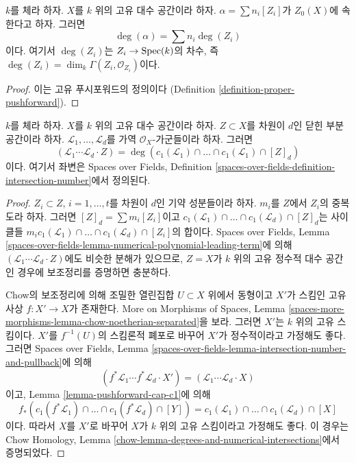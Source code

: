 \begin{lemma}
\label{lemma-spell-out-degree-zero-cycle}
$k$를 체라 하자. $X$를 $k$ 위의 고유 대수 공간이라 하자.
$\alpha = \sum n_i[Z_i]$가 $Z_0(X)$에 속한다고 하자. 그러면
$$
\deg(\alpha) = \sum n_i\deg(Z_i)
$$
이다. 여기서 $\deg(Z_i)$는 $Z_i \to \mathop{\mathrm{Spec}}(k)$의 차수, 즉
$\deg(Z_i) = \dim_k \Gamma(Z_i, \mathcal{O}_{Z_i})$이다.
\end{lemma}

\begin{proof}
이는 고유 푸시포워드의 정의이다
(Definition \ref{definition-proper-pushforward}).
\end{proof}

\begin{lemma}
\label{lemma-degrees-and-numerical-intersections}
$k$를 체라 하자. $X$를 $k$ 위의 고유 대수 공간이라 하자.
$Z \subset X$를 차원이 $d$인 닫힌 부분공간이라 하자.
$\mathcal{L}_1, \ldots, \mathcal{L}_d$를 가역
$\mathcal{O}_X$-가군들이라 하자. 그러면
$$
(\mathcal{L}_1 \cdots \mathcal{L}_d \cdot Z) =
\deg(
c_1(\mathcal{L}_1) \cap \ldots \cap c_1(\mathcal{L}_1) \cap [Z]_d)
$$
이다.
여기서 좌변은 Spaces over Fields, Definition
\ref{spaces-over-fields-definition-intersection-number}에서 정의된다.
\end{lemma}

\begin{proof}
$Z_i \subset Z$, $i = 1, \ldots, t$를 차원이 $d$인 기약 성분들이라 하자.
$m_i$를 $Z$에서 $Z_i$의 중복도라 하자. 그러면
$[Z]_d = \sum m_i[Z_i]$이고
$c_1(\mathcal{L}_1) \cap \ldots \cap c_1(\mathcal{L}_d) \cap [Z]_d$는
사이클들
$m_i c_1(\mathcal{L}_1) \cap \ldots \cap c_1(\mathcal{L}_d) \cap [Z_i]$의
합이다. Spaces over Fields, Lemma
\ref{spaces-over-fields-lemma-numerical-polynomial-leading-term}에 의해
$(\mathcal{L}_1 \cdots \mathcal{L}_d \cdot Z)$에도 비슷한 분해가
있으므로, $Z = X$가 $k$ 위의 고유 정수적 대수 공간인 경우에
보조정리를 증명하면 충분하다.

\medskip\noindent
Chow의 보조정리에 의해 조밀한 열린집합 $U \subset X$ 위에서
동형이고 $X'$가 스킴인 고유 사상 $f : X' \to X$가 존재한다.
More on Morphisms of Spaces, Lemma
\ref{spaces-more-morphisms-lemma-chow-noetherian-separated}을 보라.
그러면 $X'$는 $k$ 위의 고유 스킴이다. $X'$를
$f^{-1}(U)$의 스킴론적 폐포로 바꾸어 $X'$가 정수적이라고
가정해도 좋다. 그러면 Spaces over Fields, Lemma
\ref{spaces-over-fields-lemma-intersection-number-and-pullback}에 의해
$$
(f^*\mathcal{L}_1 \cdots f^*\mathcal{L}_d \cdot X') =
(\mathcal{L}_1 \cdots \mathcal{L}_d \cdot X)
$$
이고, Lemma \ref{lemma-pushforward-cap-c1}에 의해
$$
f_*(c_1(f^*\mathcal{L}_1) \cap \ldots \cap c_1(f^*\mathcal{L}_d) \cap [Y]) =
c_1(\mathcal{L}_1) \cap \ldots \cap c_1(\mathcal{L}_d) \cap [X]
$$
이다.
따라서 $X$를 $X'$로 바꾸어 $X$가 $k$ 위의 고유 스킴이라고
가정해도 좋다. 이 경우는 Chow Homology, Lemma
\ref{chow-lemma-degrees-and-numerical-intersections}에서 증명되었다.
\end{proof}



















